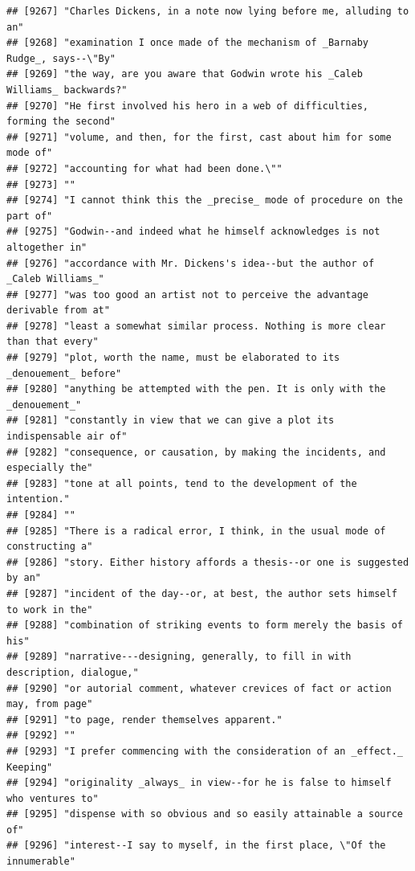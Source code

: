 \documentclass{article}\usepackage[]{graphicx}\usepackage[]{color}
\makeatletter
\newenvironment{kframe}{%
 \def\at@end@of@kframe{}%
 \ifinner\ifhmode%
  \def\at@end@of@kframe{\end{minipage}}%
  \begin{minipage}{\columnwidth}%
 \fi\fi%
 \def\FrameCommand##1{\hskip\@totalleftmargin \hskip-\fboxsep
 \colorbox{shadecolor}{##1}\hskip-\fboxsep
     \hskip-\linewidth \hskip-\@totalleftmargin \hskip\columnwidth}%
 \MakeFramed {\advance\hsize-\width
   \@totalleftmargin\z@ \linewidth\hsize
   \@setminipage}}%
 {\par\unskip\endMakeFramed%
 \at@end@of@kframe}
\newenvironment{knitrout}{}{} %
\makeatother
\begin{document}
\begin{knitrout}
\begin{kframe}
\begin{verbatim}
## [9267] "Charles Dickens, in a note now lying before me, alluding to an"              
## [9268] "examination I once made of the mechanism of _Barnaby Rudge_, says--\"By"     
## [9269] "the way, are you aware that Godwin wrote his _Caleb Williams_ backwards?"    
## [9270] "He first involved his hero in a web of difficulties, forming the second"     
## [9271] "volume, and then, for the first, cast about him for some mode of"            
## [9272] "accounting for what had been done.\""                                        
## [9273] ""                                                                            
## [9274] "I cannot think this the _precise_ mode of procedure on the part of"          
## [9275] "Godwin--and indeed what he himself acknowledges is not altogether in"        
## [9276] "accordance with Mr. Dickens's idea--but the author of _Caleb Williams_"      
## [9277] "was too good an artist not to perceive the advantage derivable from at"      
## [9278] "least a somewhat similar process. Nothing is more clear than that every"     
## [9279] "plot, worth the name, must be elaborated to its _denouement_ before"         
## [9280] "anything be attempted with the pen. It is only with the _denouement_"        
## [9281] "constantly in view that we can give a plot its indispensable air of"         
## [9282] "consequence, or causation, by making the incidents, and especially the"      
## [9283] "tone at all points, tend to the development of the intention."               
## [9284] ""                                                                            
## [9285] "There is a radical error, I think, in the usual mode of constructing a"      
## [9286] "story. Either history affords a thesis--or one is suggested by an"           
## [9287] "incident of the day--or, at best, the author sets himself to work in the"    
## [9288] "combination of striking events to form merely the basis of his"              
## [9289] "narrative---designing, generally, to fill in with description, dialogue,"    
## [9290] "or autorial comment, whatever crevices of fact or action may, from page"     
## [9291] "to page, render themselves apparent."                                        
## [9292] ""                                                                            
## [9293] "I prefer commencing with the consideration of an _effect._ Keeping"          
## [9294] "originality _always_ in view--for he is false to himself who ventures to"    
## [9295] "dispense with so obvious and so easily attainable a source of"               
## [9296] "interest--I say to myself, in the first place, \"Of the innumerable"         

\end{verbatim}
\end{kframe}
\end{knitrout}
\end{document}
